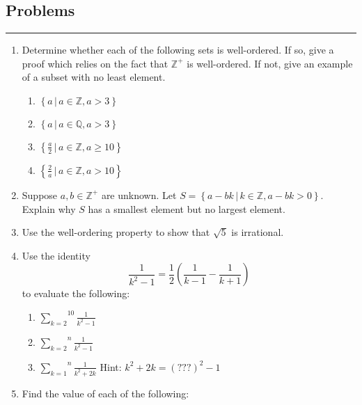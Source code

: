 \documentclass[class=article, crop=false]{standalone}
\def\integers{{\mathbb Z}}
\def\rationals{{\mathbb Q}}
\def\inlinesum#1#2{\overset{#2}{\underset{#1}{\sum}}}
\begin{document}
\subsection{Problems}
\rule{\textwidth}{1pt}
\begin{enumerate}
\item
  Determine whether each of the following sets is well-ordered.  If
  so, give a proof which relies on the fact that $\integers^+$ is well-ordered.
  If not, give an example of a subset with no least element.
  \begin{enumerate}
  \item $\left\{a\,\big|\, a\in\integers,a>3\right\}$

  \item
	$\left\{a\,\big|\, a\in\rationals,a>3\right\}$

  \item
	$\left\{\frac a2\,\big|\, a\in\integers,a\geq 10\right\}$


  \item
	$\left\{\frac 2a\,\big|\, a\in\integers,a>10\right\}$

  \end{enumerate}

\item
  Suppose $a,b\in\integers^+$ are unknown.  Let
  $S=\left\{a-bk\,\big|\, k\in\integers,a-bk>0\right\}$.
  Explain why $S$ has a smallest element but no largest element.

\item
  Use the well-ordering property to show that
  $\sqrt 5$ is irrational.

\item
  Use the identity
  $$\frac1{k^2-1}=\frac12\left(\frac1{k-1}-\frac1{k+1}\right)$$
  to evaluate the following:

  \begin{enumerate}

  \item
	$\inlinesum{k=2}{10}\frac1{k^2-1}$

  \item
	$\inlinesum{k=2}{n}\frac1{k^2-1}$

  \item
	$\inlinesum{k=1}{n}\frac1{k^2+2k}$
	\hspace{10pt}Hint: $k^2+2k=(???)^2-1$

  \end{enumerate}

\item
  Find the value of each of the following:


\end{enumerate}
\end{document}
